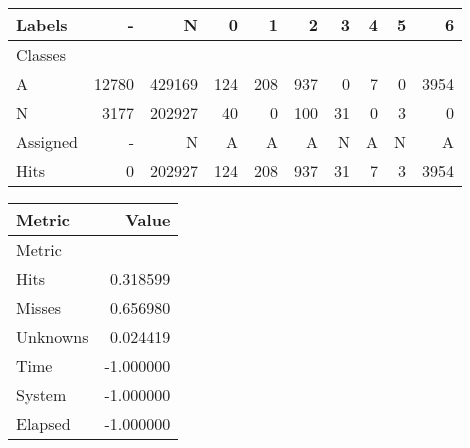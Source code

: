 \begin{tabular}{l|r|r|r|r|r|r|r|r|r}

Labels &      - &       N &    0 &    1 &    2 &   3 &  4 &  5 &     6 \\\hline
Classes  &        &         &      &      &      &     &    &    &       \\\hline
\hline
A        &  12780 &  429169 &  124 &  208 &  937 &   0 &  7 &  0 &  3954 \\\hline
N        &   3177 &  202927 &   40 &    0 &  100 &  31 &  0 &  3 &     0 \\\hline
\hline
Assigned &      - &       N &    A &    A &    A &   N &  A &  N &     A \\\hline
Hits     &      0 &  202927 &  124 &  208 &  937 &  31 &  7 &  3 &  3954 
\end{tabular}
\begin{tabular}{l|r}

Metric   &     Value \\\hline
Metric   &           \\\hline
\hline
Hits     &  0.318599 \\\hline
Misses   &  0.656980 \\\hline
Unknowns &  0.024419 \\\hline
Time     & -1.000000 \\\hline
System   & -1.000000 \\\hline
Elapsed  & -1.000000 
\end{tabular}
